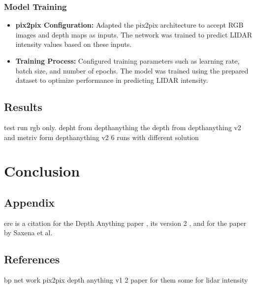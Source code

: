 \subsection{Model Training}
\begin{itemize}
	\item \textbf{pix2pix Configuration:} Adapted the pix2pix architecture to accept RGB images and depth maps as inputs. The network was trained to predict LIDAR intensity values based on these inputs.
	\item \textbf{Training Process:} Configured training parameters such as learning rate, batch size, and number of epochs. The model was trained using the prepared dataset to optimize performance in predicting LIDAR intensity.
\end{itemize}
\section{Results}
test run rgb only. depht from depthanything the depth from depthanything v2 and metriv form depthanything v2 6 runs with different solution
\chapter{Conclusion}
\section{Appendix}
ere is a citation for the Depth Anything paper \cite{depthanything}, its version 2 \cite{depth_anything_v2}, and for the paper by Saxena et al. \cite{saxena2008depth}

\section{References}
bp net work
pix2pix
depth anything v1 2
paper for them 
some for lidar intensity
